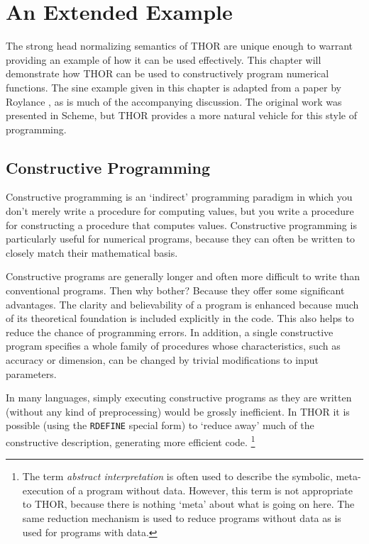\chapter{An Extended Example}
\label{chapter-examples}

	The strong head normalizing semantics of THOR are unique enough to
warrant providing an example of how it can be used effectively. This
chapter will demonstrate how THOR can be used to constructively program
numerical functions.  The sine example given in this chapter is adapted
from a paper by Roylance \cite{roylance}, as 
is much of the accompanying discussion. 
The original work was presented in Scheme, but THOR provides a more
natural vehicle for this style of programming.

\section{Constructive Programming}

	Constructive programming is an `indirect' programming paradigm in
which you don't merely write a procedure for computing values, but you
write a procedure for constructing a procedure that computes values.
Constructive programming is particularly useful for numerical programs,
because they can often be written to closely match their mathematical
basis.

	Constructive programs are generally longer and often more difficult
to write than conventional programs.  Then why bother?  Because they
offer some significant advantages.  The
clarity and believability of a program is enhanced because much of its
theoretical foundation is included explicitly in the code.  This also
helps to
reduce the chance of programming errors.  In addition, a single
constructive program specifies a whole family of procedures whose
characteristics, such as accuracy or dimension, can be changed by trivial
modifications to input parameters. 


	In many languages, simply executing constructive programs as
they are written (without any kind of preprocessing) would be grossly
inefficient.  In THOR it is possible (using the {\tt RDEFINE} special
form) to `reduce away' much of the constructive description, generating
more efficient code.  
	\footnote{The term {\em abstract interpretation} is often used to
	describe the symbolic, meta-execution of a program without data.  However,
	this term is not appropriate to THOR, because there is nothing
	`meta' about what is going on here.  The same reduction mechanism is
	used to reduce programs without data as is used for programs with
	data.}

